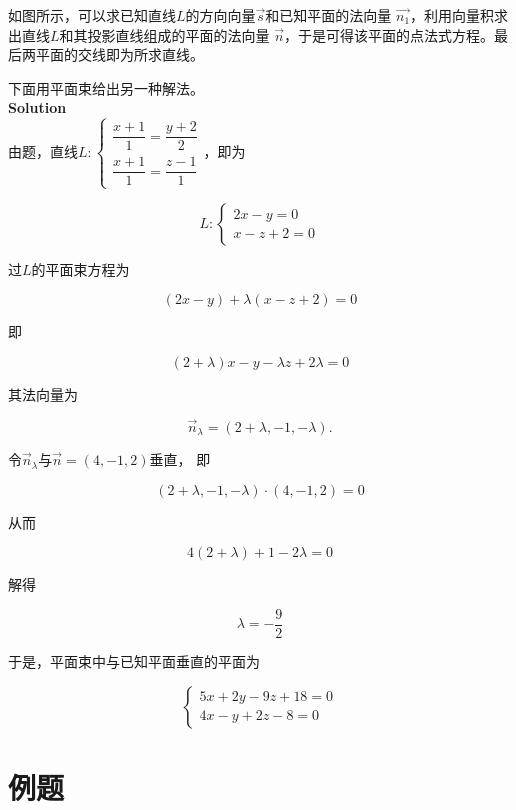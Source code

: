 \documentclass[
	11pt, %
	a4paper, %
]{WhuSakuraBook}
\begin{document}
    如图所示，可以求已知直线\(L\)的方向向量\(\overrightarrow{s}\)和已知平面的法向量
    \(\overrightarrow{n_1}\)，利用向量积求出直线\(L\)和其投影直线组成的平面的法向量
    \(\overrightarrow{n}\)，于是可得该平面的点法式方程。最后两平面的交线即为所求直线。

    下面用平面束给出另一种解法。
    \\

    \textbf{Solution}
    \\

    由题，直线\(L: \left\{\begin{array}{l}\dfrac{x+1}{1}=\dfrac{y+2}{2} \\
    \dfrac{x+1}{1}=\dfrac{z-1}{1}\end{array}\right.\)，即为

    $$
        L:\left\{\begin{array}{l}
        2 x-y=0 \\
        x-z+2=0
        \end{array}\right.
    $$

    过\(L\)的平面束方程为

    \[
        \left(2x-y\right) + \lambda \left(x-z+2\right) = 0
    \]

    即

    \[
        (2+\lambda) x-y-\lambda z+2 \lambda=0
    \]

    其法向量为

    $$
        \overrightarrow{n}_\lambda=(2+\lambda,-1,-\lambda) .
    $$

    令\(\overrightarrow{n}_\lambda\)与\(\overrightarrow{n} = \left(4,-1,2\right)\)垂直，
    即

    $$
        (2+\lambda,-1,-\lambda) \cdot(4,-1,2)=0
    $$

    从而

    $$
        4(2+\lambda)+1-2 \lambda=0
    $$

    解得

    \[
        \lambda = -\frac{9}{2}
    \]

    于是，平面束中与已知平面垂直的平面为

    $$
        \left\{\begin{array}{l}
        5 x+2y-9 z+18=0 \\
        4 x-y+2 z-8=0
        \end{array}\right.
    $$

\section{例题}
\end{document}
